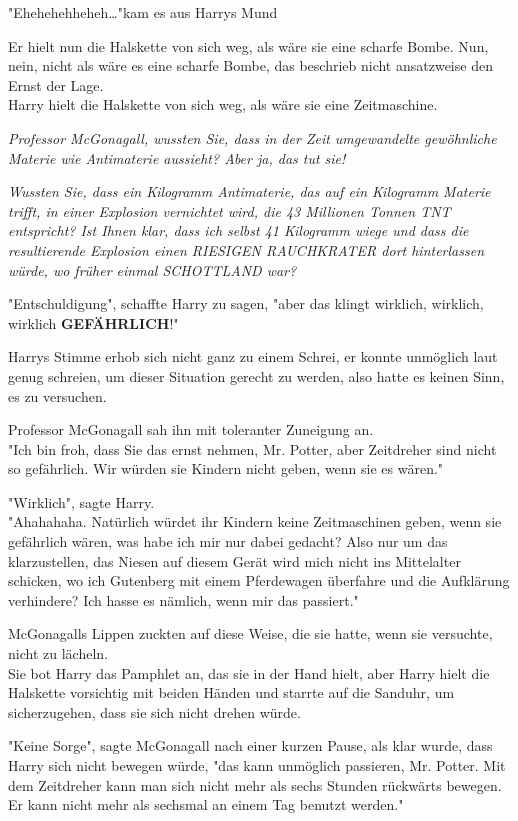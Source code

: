 {"Ehehehehheheh…"kam es aus Harrys Mund

Er hielt nun die Halskette von sich weg, als wäre sie eine scharfe Bombe. Nun, nein, nicht als wäre es eine scharfe Bombe, das beschrieb nicht ansatzweise den Ernst der Lage.\\ Harry hielt die Halskette von sich weg, als wäre sie eine Zeitmaschine.

\emph{Professor McGonagall, wussten Sie, dass in der Zeit umgewandelte gewöhnliche Materie wie Antimaterie aussieht? Aber ja, das tut sie!}

\emph{Wussten Sie, dass ein Kilogramm Antimaterie, das auf ein Kilogramm Materie trifft, in einer Explosion vernichtet wird, die 43 Millionen Tonnen TNT entspricht? Ist Ihnen klar, dass ich selbst 41 Kilogramm wiege und dass die resultierende Explosion einen RIESIGEN RAUCHKRATER dort hinterlassen würde, wo früher einmal SCHOTTLAND war?}

"Entschuldigung", schaffte Harry zu sagen, "aber das klingt wirklich, wirklich, wirklich \textbf{GEFÄHRLICH}!"

Harrys Stimme erhob sich nicht ganz zu einem Schrei, er konnte unmöglich laut genug schreien, um dieser Situation gerecht zu werden, also hatte es keinen Sinn, es zu versuchen.

Professor McGonagall sah ihn mit toleranter Zuneigung an.\\ "Ich bin froh, dass Sie das ernst nehmen, Mr. Potter, aber Zeitdreher sind nicht so gefährlich. Wir würden sie Kindern nicht geben, wenn sie es wären."

"Wirklich", sagte Harry.\\ "Ahahahaha. Natürlich würdet ihr Kindern keine Zeitmaschinen geben, wenn sie gefährlich wären, was habe ich mir nur dabei gedacht? Also nur um das klarzustellen, das Niesen auf diesem Gerät wird mich nicht ins Mittelalter schicken, wo ich Gutenberg mit einem Pferdewagen überfahre und die Aufklärung verhindere? Ich hasse es nämlich, wenn mir das passiert."

McGonagalls Lippen zuckten auf diese Weise, die sie hatte, wenn sie versuchte, nicht zu lächeln.\\ Sie bot Harry das Pamphlet an, das sie in der Hand hielt, aber Harry hielt die Halskette vorsichtig mit beiden Händen und starrte auf die Sanduhr, um sicherzugehen, dass sie sich nicht drehen würde.

"Keine Sorge", sagte McGonagall nach einer kurzen Pause, als klar wurde, dass Harry sich nicht bewegen würde, "das kann unmöglich passieren, Mr. Potter. Mit dem Zeitdreher kann man sich nicht mehr als sechs Stunden rückwärts bewegen. Er kann nicht mehr als sechsmal an einem Tag benutzt werden."

}
